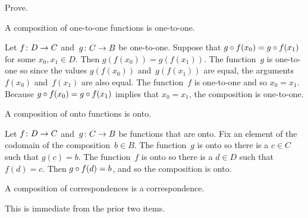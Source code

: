 \documentclass{test}  %
\begin{document}
\begin{problem} \label{InteractionOneToONeOntoWithComposition}
Prove.
\begin{exes}
\begin{exercise} 
  A composition of one-to-one functions is one-to-one.
\end{exercise}
\begin{answer}
  Let $\mbox{$f\colon D\to C$}$ and~$\mbox{$g\colon C\to B$}$ be one-to-one.
  Suppose that $g\mathbin{\circ} f(x_0)=g\mathbin{\circ} f(x_1)$ for
  some $x_0,x_1\in D$.
  Then $g(f(x_0))=g(f(x_1))$.
  The function~$g$ is one-to-one so since the values $g(f(x_0))$ 
  and~$g(f(x_1))$ are equal, the arguments $f(x_0)$ and~$f(x_1)$ are
  also equal.
  The function~$f$ is one-to-one and so $x_0=x_1$.
  Because $g\mathbin{\circ} f(x_0)=g\mathbin{\circ} f(x_1)$ implies that
  $x_0=x_1$, the composition is one-to-one.  
\end{answer}
\begin{exercise} 
  A composition of onto functions is onto.
\end{exercise}
\begin{answer}
  Let $\mbox{$f\colon D\to C$}$ and~$\mbox{$g\colon C\to B$}$ be functions that are onto.
  Fix an element of the codomain of the composition~$b\in B$.
  The function~$g$ is onto so there is a $c\in C$ such that $g(c)=b$.
  The function~$f$ is onto so there is a $d\in D$ such that $f(d)=c$.
  Then $g\mathbin{\circ} f(d)=b$, and so the composition is onto.
\end{answer}
\begin{exercise} 
  A composition of correspondences is a correspondence.
\end{exercise}
\begin{answer}
  This is immediate from the prior two items. 
\end{answer}
\end{exes}

\end{problem}
\end{document}
